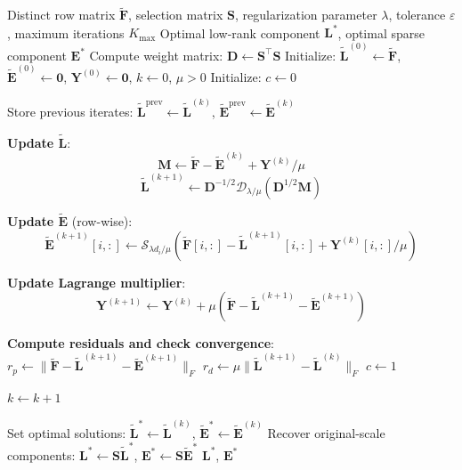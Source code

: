 \begin{algorithm}[tb]
\caption{Structured RPCA via Weighted Optimization}
\label{alg:structured_rpca}
\begin{algorithmic}[1]
\Require Distinct row matrix $\tilde{\mathbf{F}}$, selection matrix $\mathbf{S}$, regularization parameter $\lambda$, tolerance $\varepsilon$, maximum iterations $K_{\max}$
\Ensure Optimal low-rank component $\mathbf{L}^*$, optimal sparse component $\mathbf{E}^*$
\State Compute weight matrix: $\mathbf{D} \gets \mathbf{S}^\top \mathbf{S}$
\State Initialize: $\tilde{\mathbf{L}}^{(0)} \gets \tilde{\mathbf{F}}$, $\tilde{\mathbf{E}}^{(0)} \gets \mathbf{0}$, $\mathbf{Y}^{(0)} \gets \mathbf{0}$, $k \gets 0$, $\mu > 0$
\State Initialize: $c \gets 0$ 

    \State Store previous iterates: $\tilde{\mathbf{L}}^{\text{prev}} \gets \tilde{\mathbf{L}}^{(k)}$, $\tilde{\mathbf{E}}^{\text{prev}} \gets \tilde{\mathbf{E}}^{(k)}$
    
    \State \textbf{Update $\tilde{\mathbf{L}}$}:
    $$\mathbf{M} \gets \tilde{\mathbf{F}} - \tilde{\mathbf{E}}^{(k)} + \mathbf{Y}^{(k)}/\mu$$
    $$\tilde{\mathbf{L}}^{(k+1)} \gets \mathbf{D}^{-1/2} \mathcal{D}_{\lambda/\mu}\left(\mathbf{D}^{1/2} \mathbf{M}\right)$$
    
    \State \textbf{Update $\tilde{\mathbf{E}}$} (row-wise):
        $$\tilde{\mathbf{E}}^{(k+1)}[i,:] \gets \mathcal{S}_{\lambda d_i/\mu}\left(\tilde{\mathbf{F}}[i,:] - \tilde{\mathbf{L}}^{(k+1)}[i,:] + \mathbf{Y}^{(k)}[i,:]/\mu\right)$$
    \EndFor
    
    \State \textbf{Update Lagrange multiplier}:
    \[
    \mathbf{Y}^{(k+1)} \gets \mathbf{Y}^{(k)} + \mu \left(\tilde{\mathbf{F}} - \tilde{\mathbf{L}}^{(k+1)} - \tilde{\mathbf{E}}^{(k+1)}\right)
    \]
    
    \State \textbf{Compute residuals and check convergence}:
    \State $r_p \gets \|\tilde{\mathbf{F}} - \tilde{\mathbf{L}}^{(k+1)} - \tilde{\mathbf{E}}^{(k+1)}\|_F$ 
    \State $r_d \gets \mu \|\tilde{\mathbf{L}}^{(k+1)} - \tilde{\mathbf{L}}^{(k)}\|_F$ 
        \State $c \gets 1$ 
    \EndIf
    
    \State $k \gets k + 1$
\EndWhile

\State Set optimal solutions: $\tilde{\mathbf{L}}^* \gets \tilde{\mathbf{L}}^{(k)}$, $\tilde{\mathbf{E}}^* \gets \tilde{\mathbf{E}}^{(k)}$
\State Recover original-scale components: $\mathbf{L}^* \gets \mathbf{S} \tilde{\mathbf{L}}^*$, $\mathbf{E}^* \gets \mathbf{S} \tilde{\mathbf{E}}^*$
\State \Return $\mathbf{L}^*$, $\mathbf{E}^*$
\end{algorithmic}
\end{algorithm}

